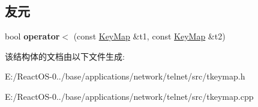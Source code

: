 \subsection*{友元}
\begin{DoxyCompactItemize}
\item 
\mbox{\label{struct_key_map_ab21d92d59aed8cf3b9155ba25ade76fd}} 
bool {\bfseries operator$<$} (const \hyperlink{struct_key_map}{Key\+Map} \&t1, const \hyperlink{struct_key_map}{Key\+Map} \&t2)
\end{DoxyCompactItemize}


该结构体的文档由以下文件生成\+:\begin{DoxyCompactItemize}
\item 
E\+:/\+React\+O\+S-\/0../base/applications/network/telnet/src/tkeymap.\+h\item 
E\+:/\+React\+O\+S-\/0../base/applications/network/telnet/src/tkeymap.\+cpp\end{DoxyCompactItemize}
